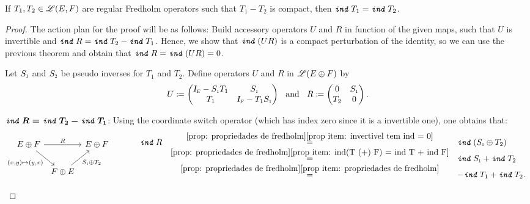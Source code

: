 \begin{teorema}
\label{teo: diferenca compacta, indices simetricos}
If $T_1, T_2 \in \mathscr L(E, F)$ are regular Fredholm operators such that $T_1-T_2$ is compact, then $\texttt{\textit{ind}}\, T_1=\texttt{\textit{ind}}\, T_2$.
\begin{proof}
The action plan for the proof will be as follows: Build accessory operators $U$ and $R$ in function of the given maps, such that $U$ is invertible and $\texttt{\textit{ind}}\, R = \texttt{\textit{ind}}\, T_2 - \texttt{\textit{ind}}\, T_1$. Hence, we show that $\texttt{\textit{ind}}\, (UR)$ is a compact perturbation of the identity, so we can use the previous theorem and obtain that $\texttt{\textit{ind}}\, R=\texttt{\textit{ind}}\,(UR)=0$.

Let $\sub S1$ and $\sub S2$ be pseudo inverses for $T_1$ and $T_2$. Define operators $U$ and $R$ in $\mathscr L(E \oplus F)$ by
\begin{equation*}
    U\coloneqq \begin{pmatrix}
\sub \Id E-\sub S1 T_1 & \sub S1 \\
T_1 & \sub\Id F-T_1 \sub S1
\end{pmatrix} \e R\coloneqq \begin{pmatrix}
0 & \sub S1 \\
T_2 & 0
\end{pmatrix}.
\end{equation*}
\begin{itroman}
\item $\boldsymbol{\texttt{\textit{ind}}\, R = \texttt{\textit{ind}}\, T_2 - \texttt{\textit{ind}}\, T_1}$: Using the coordinate switch operator (which has index zero since it is a invertible one), one obtains that:  
\begin{equation*}
\begin{tikzcd}[column sep=0.15cm]
E\oplus F \arrow[rr, "R"] \arrow[rd, "{(x,y) \mapsto (y,x)}"'] &           & E \oplus F \\
& F \oplus E \arrow[ru, "\sub S1 \oplus T_2"'] &
\end{tikzcd}
\hspace{1cm} 
\begin{array}{rcl}
    \ind R &\overset{\ref{prop: propriedades de fredholm}\ref{prop item: invertivel tem ind = 0}}=& \ind(\sub S1 \oplus T_2) \\
    &\overset{\ref{prop: propriedades de fredholm}\ref{prop item: ind(T (+) F) = ind T + ind F}}=& \ind \sub S1 + \ind T_2 \\
    &\overset{\ref{prop: propriedades de fredholm}\ref{prop item: propriedades de fredholm}}=& - \ind T_1+ \ind T_2.
\end{array}
\end{equation*}


\end{itroman}
\end{proof}
\end{teorema}
